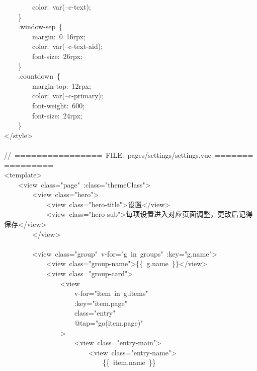 \documentclass[a4paper,10pt]{article}
\begin{document}
{\ttfamily\footnotesize\raggedright
~~~~~~~~color:~var(--c-text);\\
~~~~\}\\
~~~~.window-sep~\{\\
~~~~~~~~margin:~0~16rpx;\\
~~~~~~~~color:~var(--c-text-aid);\\
~~~~~~~~font-size:~26rpx;\\
~~~~\}\\
~~~~.countdown~\{\\
~~~~~~~~margin-top:~12rpx;\\
~~~~~~~~color:~var(--c-primary);\\
~~~~~~~~font-weight:~600;\\
~~~~~~~~font-size:~24rpx;\\
~~~~\}\\
</style>\\
\mbox{}\\
//~================~FILE:~pages/settings/settings.vue~================\\
<template>\\
~~~~<view~class="page"~:class="themeClass">\\
~~~~~~~~<view~class="hero">\\
~~~~~~~~~~~~<view~class="hero-title">设置</view>\\
~~~~~~~~~~~~<view~class="hero-sub">每项设置进入对应页面调整，更改后记得保存</view>\\
~~~~~~~~</view>\\
\mbox{}\\
~~~~~~~~<view~class="group"~v-for="g~in~groups"~:key="g.name">\\
~~~~~~~~~~~~<view~class="group-name">\{\{~g.name~\}\}</view>\\
~~~~~~~~~~~~<view~class="group-card">\\
~~~~~~~~~~~~~~~~<view\\
~~~~~~~~~~~~~~~~~~~~v-for="item~in~g.items"\\
~~~~~~~~~~~~~~~~~~~~:key="item.page"\\
~~~~~~~~~~~~~~~~~~~~class="entry"\\
~~~~~~~~~~~~~~~~~~~~@tap="go(item.page)"\\
~~~~~~~~~~~~~~~~>\\
~~~~~~~~~~~~~~~~~~~~<view~class="entry-main">\\
~~~~~~~~~~~~~~~~~~~~~~~~<view~class="entry-name">\\
~~~~~~~~~~~~~~~~~~~~~~~~~~~~\{\{~item.name~\}\}\\
}
\end{document}
